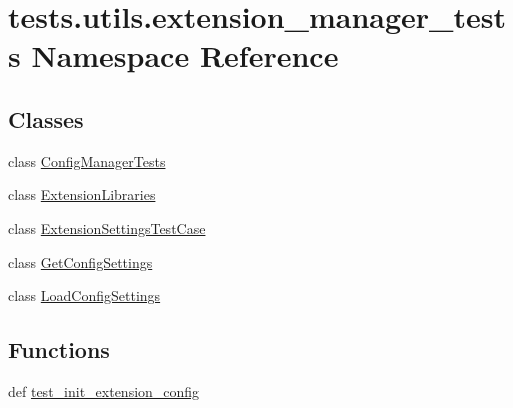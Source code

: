 \hypertarget{namespacetests_1_1utils_1_1extension__manager__tests}{\section{tests.\+utils.\+extension\+\_\+manager\+\_\+tests Namespace Reference}
\label{namespacetests_1_1utils_1_1extension__manager__tests}
}
\subsection*{Classes}
\begin{DoxyCompactItemize}
\item 
class \hyperlink{classtests_1_1utils_1_1extension__manager__tests_1_1ConfigManagerTests}{Config\+Manager\+Tests}
\item 
class \hyperlink{classtests_1_1utils_1_1extension__manager__tests_1_1ExtensionLibraries}{Extension\+Libraries}
\item 
class \hyperlink{classtests_1_1utils_1_1extension__manager__tests_1_1ExtensionSettingsTestCase}{Extension\+Settings\+Test\+Case}
\item 
class \hyperlink{classtests_1_1utils_1_1extension__manager__tests_1_1GetConfigSettings}{Get\+Config\+Settings}
\item 
class \hyperlink{classtests_1_1utils_1_1extension__manager__tests_1_1LoadConfigSettings}{Load\+Config\+Settings}
\end{DoxyCompactItemize}
\subsection*{Functions}
\begin{DoxyCompactItemize}
\item 
def \hyperlink{namespacetests_1_1utils_1_1extension__manager__tests_a369ad0d8b9b3bbcba076f242c0eeec0e}{test\+\_\+init\+\_\+extension\+\_\+config}
\end{DoxyCompactItemize}


